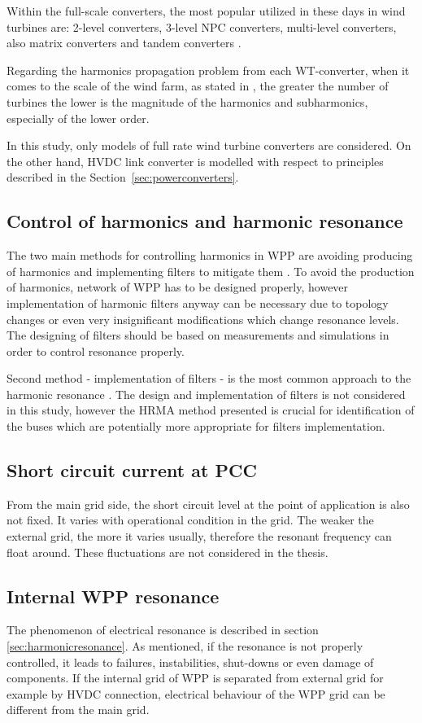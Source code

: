 \documentclass[12pt]{report} %
\begin{document}
Within the full-scale converters, the most popular utilized in these days in wind turbines are: 2-level converters, 3-level NPC converters, multi-level converters, also matrix converters and tandem converters \cite{pham2013}.

Regarding the harmonics propagation problem from each WT-converter, when it comes to the scale of the wind farm, as stated in \cite{das}, the greater the number of turbines the lower is the magnitude of the harmonics and subharmonics, especially of the lower order.

In this study, only models of full rate wind turbine converters are considered. On the other hand, HVDC link converter is modelled with respect to principles described in the Section~\ref{sec:powerconverters}.

\subsection{Control of harmonics and harmonic resonance}
The two main methods for controlling harmonics in WPP are avoiding producing of harmonics and implementing filters to mitigate them \cite{bradt2012}. To avoid the production of harmonics, network of WPP has to be designed properly, however implementation of harmonic filters anyway can be necessary due to topology changes or even very insignificant modifications which change resonance levels. The designing of filters should be based on measurements and simulations in order to control resonance properly.

Second method - implementation of filters - is the most common approach to the harmonic resonance \cite{bradt2012}. The design and implementation of filters is not considered in this study, however the HRMA method presented is crucial for identification of the buses which are potentially more appropriate for filters implementation.

\subsection{Short circuit current at PCC}
From the main grid side, the short circuit level at the point of application is also not fixed. It varies with operational condition in the grid. The weaker the external grid, the more it varies usually, therefore the resonant frequency can float around. These fluctuations are not considered in the thesis.

\subsection{Internal WPP resonance}
The phenomenon of electrical resonance is described in section \ref{sec:harmonicresonance}. As mentioned, if the resonance is not properly controlled, it leads to failures, instabilities, shut-downs or even damage of components. If the internal grid of WPP is separated from external grid for example by HVDC connection, electrical behaviour of the WPP grid can be different from the main grid.
\end{document}
